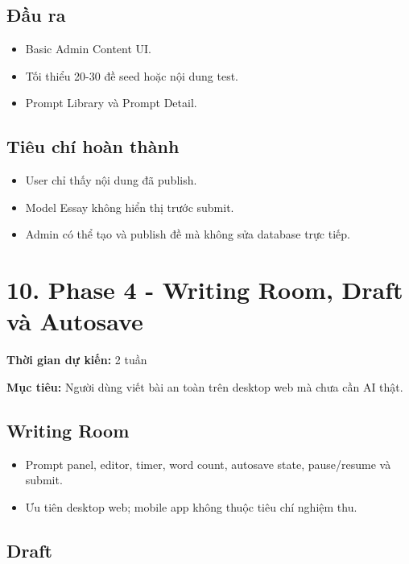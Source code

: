 \documentclass[
  11pt,
  a4paper,
]{article}
\begin{document}
\subsection{Đầu ra}\label{ux111ux1ea7u-ra-3}

\begin{itemize}
\item
  Basic Admin Content UI.
\item
  Tối thiểu 20-30 đề seed hoặc nội dung test.
\item
  Prompt Library và Prompt Detail.
\end{itemize}

\subsection{Tiêu chí hoàn
thành}\label{tiuxeau-chuxed-houxe0n-thuxe0nh-3}

\begin{itemize}
\item
  User chỉ thấy nội dung đã publish.
\item
  Model Essay không hiển thị trước submit.
\item
  Admin có thể tạo và publish đề mà không sửa database trực tiếp.
\end{itemize}

\section{10. Phase 4 - Writing Room, Draft và
Autosave}\label{phase-4---writing-room-draft-vuxe0-autosave}

\textbf{Thời gian dự kiến:} 2 tuần

\textbf{Mục tiêu:} Người dùng viết bài an toàn trên desktop web mà chưa
cần AI thật.

\subsection{Writing Room}\label{writing-room}

\begin{itemize}
\item
  Prompt panel, editor, timer, word count, autosave state, pause/resume
  và submit.
\item
  Ưu tiên desktop web; mobile app không thuộc tiêu chí nghiệm thu.
\end{itemize}

\subsection{Draft}\label{draft}
\end{document}

